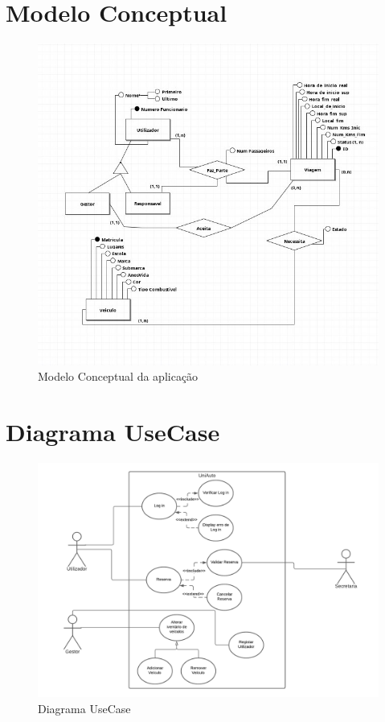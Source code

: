 \documentclass[11pt,a4paper]{report}%
\begin{document}
\section{Modelo Conceptual}
\begin{figure}[h!]
\centering
\includegraphics[scale=0.5]{Pictures/diagrama.jpg}
\caption{\label{fig:html} Modelo Conceptual da aplicação}
\end{figure}
\newpage
\section{Diagrama UseCase}

\begin{figure}[h!]
\centering
\includegraphics[scale=0.6]{Pictures/UniAuto.png}
\caption{\label{fig:Diagrama} Diagrama UseCase}
\end{figure}
\newpage
\end{document}
